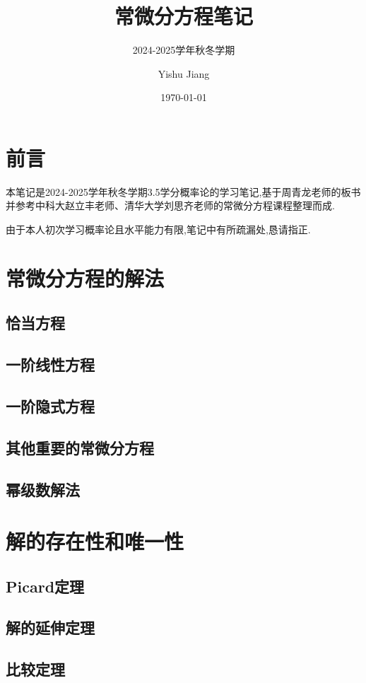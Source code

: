 \documentclass[lang=cn,10pt]{elegantbook}
\title{常微分方程笔记}
\subtitle{2024-2025学年秋冬学期}
\author{Yishu Jiang}
\institute{School of Economics,Zhejiang University}
\date{\today}
\begin{document}
\maketitle
\frontmatter
\chapter*{前言}
{\fangsong 
    本笔记是2024-2025学年秋冬学期3.5学分概率论的学习笔记,基于周青龙老师的板书并参考中科大赵立丰老师、清华大学刘思齐老师的常微分方程课程整理而成.

    由于本人初次学习概率论且水平能力有限,笔记中有所疏漏处,恳请指正.
}
\newpage

\tableofcontents

\mainmatter
\chapter{常微分方程的解法}
\section{恰当方程}
\section{一阶线性方程}
\section{一阶隐式方程}
\section{其他重要的常微分方程}
\section{幂级数解法}
\newpage

\chapter{解的存在性和唯一性}
\section{Picard定理}
\section{解的延伸定理}
\section{比较定理}
\newpage
\end{document}
